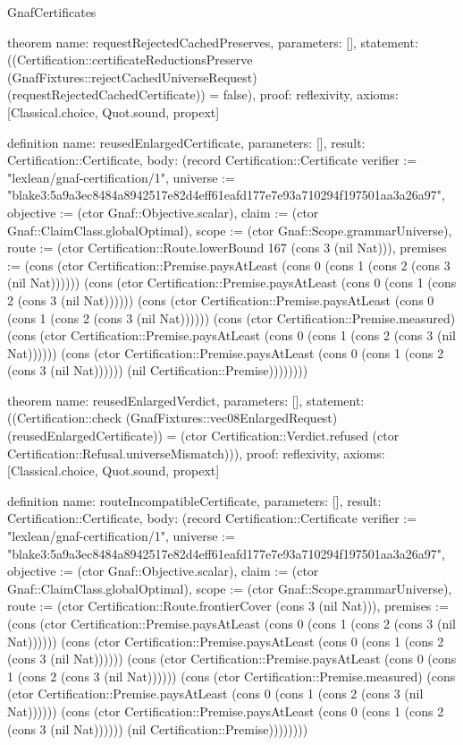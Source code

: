 \begin{lexlean}{GnafCertificates}
\begin{semanticmodule}
theorem{
  name: requestRejectedCachedPreserves,
  parameters: [],
  statement: ((Certification::certificateReductionsPreserve (GnafFixtures::rejectCachedUniverseRequest) (requestRejectedCachedCertificate)) = false),
  proof: reflexivity{},
  axioms: [Classical.choice, Quot.sound, propext]
}

definition{
  name: reusedEnlargedCertificate,
  parameters: [],
  result: Certification::Certificate,
  body: (record Certification::Certificate {verifier := "lexlean/gnaf-certification/1", universe := "blake3:5a9a3ec8484a8942517e82d4eff61eafd177e7e93a710294f197501aa3a26a97", objective := (ctor Gnaf::Objective.scalar), claim := (ctor Gnaf::ClaimClass.globalOptimal), scope := (ctor Gnaf::Scope.grammarUniverse), route := (ctor Certification::Route.lowerBound 167 (cons 3 (nil Nat))), premises := (cons (ctor Certification::Premise.paysAtLeast (cons 0 (cons 1 (cons 2 (cons 3 (nil Nat)))))) (cons (ctor Certification::Premise.paysAtLeast (cons 0 (cons 1 (cons 2 (cons 3 (nil Nat)))))) (cons (ctor Certification::Premise.paysAtLeast (cons 0 (cons 1 (cons 2 (cons 3 (nil Nat)))))) (cons (ctor Certification::Premise.measured) (cons (ctor Certification::Premise.paysAtLeast (cons 0 (cons 1 (cons 2 (cons 3 (nil Nat)))))) (cons (ctor Certification::Premise.paysAtLeast (cons 0 (cons 1 (cons 2 (cons 3 (nil Nat)))))) (nil Certification::Premise)))))))})
}

theorem{
  name: reusedEnlargedVerdict,
  parameters: [],
  statement: ((Certification::check (GnafFixtures::vec08EnlargedRequest) (reusedEnlargedCertificate)) = (ctor Certification::Verdict.refused (ctor Certification::Refusal.universeMismatch))),
  proof: reflexivity{},
  axioms: [Classical.choice, Quot.sound, propext]
}

definition{
  name: routeIncompatibleCertificate,
  parameters: [],
  result: Certification::Certificate,
  body: (record Certification::Certificate {verifier := "lexlean/gnaf-certification/1", universe := "blake3:5a9a3ec8484a8942517e82d4eff61eafd177e7e93a710294f197501aa3a26a97", objective := (ctor Gnaf::Objective.scalar), claim := (ctor Gnaf::ClaimClass.globalOptimal), scope := (ctor Gnaf::Scope.grammarUniverse), route := (ctor Certification::Route.frontierCover (cons 3 (nil Nat))), premises := (cons (ctor Certification::Premise.paysAtLeast (cons 0 (cons 1 (cons 2 (cons 3 (nil Nat)))))) (cons (ctor Certification::Premise.paysAtLeast (cons 0 (cons 1 (cons 2 (cons 3 (nil Nat)))))) (cons (ctor Certification::Premise.paysAtLeast (cons 0 (cons 1 (cons 2 (cons 3 (nil Nat)))))) (cons (ctor Certification::Premise.measured) (cons (ctor Certification::Premise.paysAtLeast (cons 0 (cons 1 (cons 2 (cons 3 (nil Nat)))))) (cons (ctor Certification::Premise.paysAtLeast (cons 0 (cons 1 (cons 2 (cons 3 (nil Nat)))))) (nil Certification::Premise)))))))})
}


\end{semanticmodule}
\end{lexlean}
